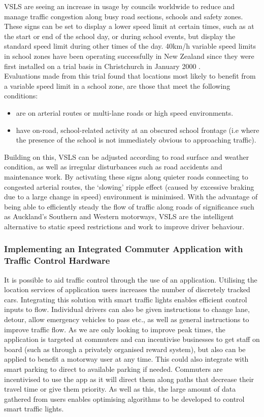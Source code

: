 \documentclass[twoside, a4paper, 11pt]{article}
\begin{document}
VSLS are seeing an increase in usage by councils worldwide to reduce and manage traffic congestion along busy road sections, schools and safety zones. These signs can be set to display a lower speed limit at certain times, such as at the start or end of the school day, or during school events, but display the standard speed limit during other times of the day. 40km/h variable speed limits in school zones have been operating successfully in New Zealand since they were first installed on a trial basis in Christchurch in January 2000 \citep{nzta11}.
\\Evaluations made from this trial found that locations most likely to benefit from a variable speed limit in a school zone, are those that meet the following conditions:  
\begin{itemize}
\item are on arterial routes or multi-lane roads or high speed environments.
\item have on-road, school-related activity at an obscured school frontage (i.e where the presence of the school is not immediately obvious to approaching traffic).
\end{itemize}
Building on this, VSLS can be adjusted according to road surface and weather condition, as well as irregular disturbances such as road accidents and maintenance work. By activating these signs along quieter roads connecting to congested arterial routes, the `slowing' ripple effect (caused by excessive braking due to a large change in speed) environment is minimised. With the advantage of being able to efficiently steady the flow of traffic along roads of significance such as Auckland's Southern and Western motorways, VSLS are the intelligent alternative to static speed restrictions and work to improve driver behaviour.
 
\subsubsection{Implementing an Integrated Commuter Application with Traffic Control Hardware}
It is possible to aid traffic control through the use of an application. Utilising the location services of application users increases the number of discretely tracked cars. Integrating this solution with smart traffic lights enables efficient control inputs to flow. Individual drivers can also be given instructions to change lane, detour, allow emergency vehicles to pass etc., as well as general instructions to improve traffic flow. As we are only looking to improve peak times, the application is targeted at commuters and can incentivise businesses to get staff on board (such as through a privately organised reward system), but also can be applied to benefit a motorway user at any time. This could also integrate with smart parking to direct to available parking if needed. Commuters are incentivised to use the app as it will direct them along paths that decrease their travel time or give them priority. As well as this, the large amount of data gathered from users enables optimising algorithms to be developed to control smart traffic lights.
 
\end{document}
